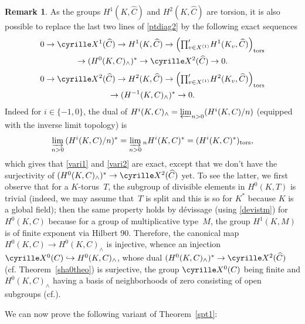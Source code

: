 \documentclass[11pt]{article}
\newcommand{\cf}{cf.\xspace}
\newcommand\hto{\mathrel{\lhook\joinrel\to}}
\newcommand{\tprod}{{\textstyle\prod}}
\theoremstyle{plain}
\theoremstyle{definition}
\newtheorem{rema}[theo]{Remark}
\newcommand\Sha{\cyrille X}
\newcommand \tors {\mathrm{tors}}
\begin{document}
\begin{rema} \label{variantors}
As the groups $H^1(K,\widehat C)$ and $H^2(K,\widehat C)$ are torsion,
it is also possible to replace the last two lines of \eqref{ptdiag2} by
the following exact sequences\vspace*{-3pt}
\begin{multline} \label{vari1}
0 \to \Sha^1(\widehat C) \to H^1(K,\widehat C) \to \Bigl(\tprod^{\prime}_{v \in X^{(1)}}H^1(K_v,\widehat C)\Bigr)_\tors\\
\to (H^0(K,C)_{\wedge}) ^* \to\Sha^2(\widehat C) \to 0.
\end{multline}
\vspace*{-20pt}
\begin{multline} \label{vari2}
0 \to \Sha^2(\widehat C) \to H^2(K,\widehat C) \to \Bigl(\tprod^{\prime}_{v \in X^{(1)}}H^2(K_v,\widehat C) \Bigl)_\tors\\
\to (H^{-1}(K,C)_{\wedge}) ^* \to 0.
\end{multline}
Indeed for $i \in \{-1,0\}$, the dual of $H^i(K,C)_{\wedge}=
\varprojlim_{n >0} (H^i(K,C)/n)$ (equipped with the inverse limit topology) is
\[
\varinjlim_{n >0} \, (H^i(K,C)/n)^*=\varinjlim_{n >0} {}_n H^i(K,C)^*=
(H^i(K,C)^*)_\tors,
\]
which gives that \eqref{vari1} and \eqref{vari2} are exact,
except that we don't have the surjectivity of
$(H^0(K,C)_{\wedge}) ^* \to \Sha^2(\widehat C)$ yet. To see the latter,
we first observe that for a $K$-torus~$T$, the subgroup of divisible
elements in $H^0(K,T)$ is trivial (indeed, we may assume that~$T$ is split
and this is so for $K^*$ because $K$ is a global field); then the same
property holds by dévissage (using \eqref{devistm}) for $H^0(K,C)$ because
for a group of multiplicative type~$M$, the group $H^1(K,M)$ is of finite
exponent via Hilbert 90. Therefore, the canonical map $H^0(K,C) \to
H^0(K,C)_{\wedge}$ is injective, whence
an injection $\Sha^0(C) \hto\nobreak H^0(K,C)_{\wedge}$, whose dual
$(H^0(K,C)_{\wedge})^* \to \Sha^2(\widehat C)$ (\cf Theorem~\ref{sha0theo})
is surjective, the group $\Sha^0(C)$ being finite and $H^0(K,C)_{\wedge}$
having a basis of neighborhoods of zero
consisting of open subgroups (\cf \cite[Lem.\,2.4]{hss}).
\end{rema}

We can now prove the following variant of Theorem~\ref{spt1}:
\end{document}
